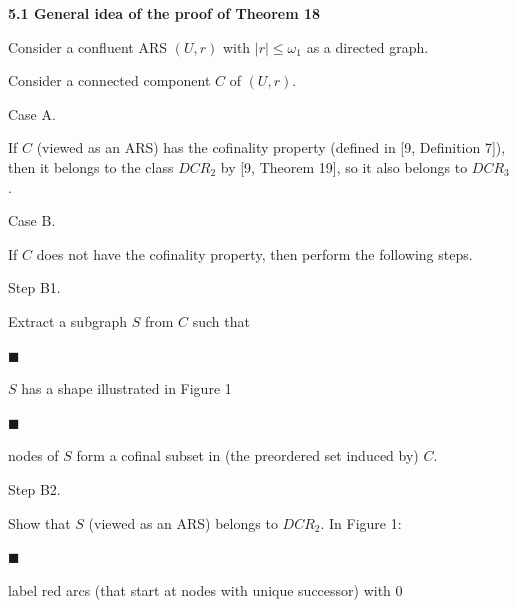\documentclass[10pt,a4paper]{amsart}
\begin{document}
\par\medskip\noindent\textbf{5.1 General idea of the proof of Theorem 18}\par
 
 
Consider a confluent ARS $(U,r)$ with $|r|\leq\omega_{1}$ as a directed graph.\par
 
 
 
Consider a connected component $C$ of $(U,r)$.\par
  Case A.  
 
If $C$ (viewed as an ARS) has the cofinality property (defined in [9, Definition 7]), then it belongs to the class $DCR_{2}$ by [9, Theorem 19], so it also belongs to $DCR_{3}$.\par
 
  Case B.  
 
If $C$ does not have the cofinality property, then perform the following steps.\par
  Step B1.  
 
Extract a subgraph $S$ from $C$ such that\par
  
\par\noindent  $\blacksquare$ 
 
$S$ has a shape illustrated in Figure 1\par
 
 
 
\par\noindent  $\blacksquare$ 
 
nodes of $S$ form a cofinal subset in (the preordered set induced by) $C$.\par
 
 
  
  Step B2.  
 
Show that $S$ (viewed as an ARS) belongs to $DCR_{2}$. In Figure 1:\par
  
\par\noindent  $\blacksquare$ 
 
label red arcs (that start at nodes with unique successor) with 0\par
 
\end{document}
